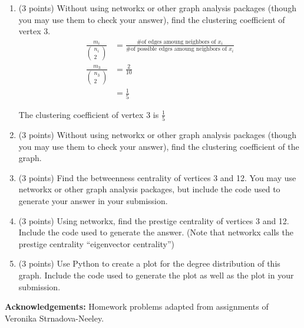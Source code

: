 \documentclass[11pt]{article}
\begin{document}
\begin{enumerate}
    \item (3 points) Without using networkx or other graph analysis packages
    (though you may use them to check your answer), find the clustering
    coefficient of vertex 3.
    \begin{align*}
        \frac{ m_{i} }{ ( \substack{ n_{i} \\ 2} ) } &= \frac{ \text{\# of edges amoung neighbors of } x_{i} }{ \text{\# of possible edges amoung neighbors of } x_{i} } \\
        \frac{ m_{3} }{ ( \substack{ n_{3} \\ 2} ) } &= \frac{2}{10} \\
        &= \frac{1}{5}
    \end{align*}
    \begin{tcolorbox}[width=\linewidth,title=Problem 3 Answer - Clustering Coefficient]
        The clustering coefficient of vertex 3 is $\frac{1}{5}$
    \end{tcolorbox}

    \item (3 points) Without using networkx or other graph analysis packages
    (though you may use them to check your answer), find the clustering
    coefficient of the graph.

    \item (3 points) Find the betweenness centrality of vertices 3 and 12. You
    may use networkx or other graph analysis packages, but include the code used
    to generate your answer in your submission.

    \item (3 points) Using networkx, find the prestige centrality of vertices 3
    and 12. Include the code used to generate the answer. (Note that networkx
    calls the prestige centrality ``eigenvector centrality'')

    \item (3 points) Use Python to create a plot for the degree distribution of
    this graph.  Include the code used to generate the plot as well as the plot
    in your submission.

\end{enumerate}

{\bf Acknowledgements:} Homework problems adapted from assignments of
Veronika Strnadova-Neeley.
\end{document}
